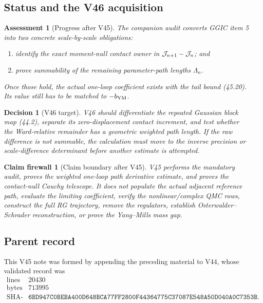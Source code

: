 \documentclass[11pt,oneside]{book}
\newtheorem{assessment}[theorem]{Assessment}
\newtheorem{firewall}[theorem]{Claim firewall}
\newtheorem{decision}[theorem]{Decision}
\theoremstyle{definition}
\theoremstyle{remark}
\begin{document}
\subsection{Status and the V46 acquisition}

\begin{assessment}[Progress after V45]
\label{ass:e8v45-status}
The companion audit converts GGIC item 5 into two concrete
scale-by-scale obligations:
\begin{enumerate}
\item identify the exact moment-null contact owner in
      \({\cal J}_{n+1}-{\cal J}_n\); and
\item prove summability of the remaining parameter-path lengths
      \(\Lambda_n\).
\end{enumerate}
Once those hold, the actual one-loop coefficient exists with the
tail bound (45.20).  Its value still has to be matched to
\(-b_{\rm YM}\).
\end{assessment}

\begin{decision}[V46 target]
\label{dec:e8v45-next}
V46 should differentiate the repeated Gaussian block map (44.2),
separate its zero-displacement contact increment, and test whether
the Ward-relative remainder has a geometric weighted path length.
If the raw difference is not summable, the calculation must move to
the inverse precision or scale-difference determinant before another
estimate is attempted.
\end{decision}

\begin{firewall}[Claim boundary after V45]
\label{fire:e8v45-claim}
V45 performs the mandatory audit, proves the weighted one-loop path
derivative estimate, and proves the contact-null Cauchy telescope.
It does not populate the actual adjacent reference path, evaluate
the limiting coefficient, verify the nonlinear/complex QMC rows,
construct the full RG trajectory, remove the regulators, establish
Osterwalder--Schrader reconstruction, or prove the Yang--Mills mass
gap.
\end{firewall}

\subsection{Parent record}

This V45 note was formed by appending the preceding material to V44,
whose validated record was
\[
\begin{array}{c|c}
\text{lines}&20430\\
\text{bytes}&713995\\
\text{SHA-256}&
\texttt{6BD947C0BEBA400D648BCA77FF2800F44364775C37087E548A50D040A0C7353B}.
\end{array}
\]
\end{document}
